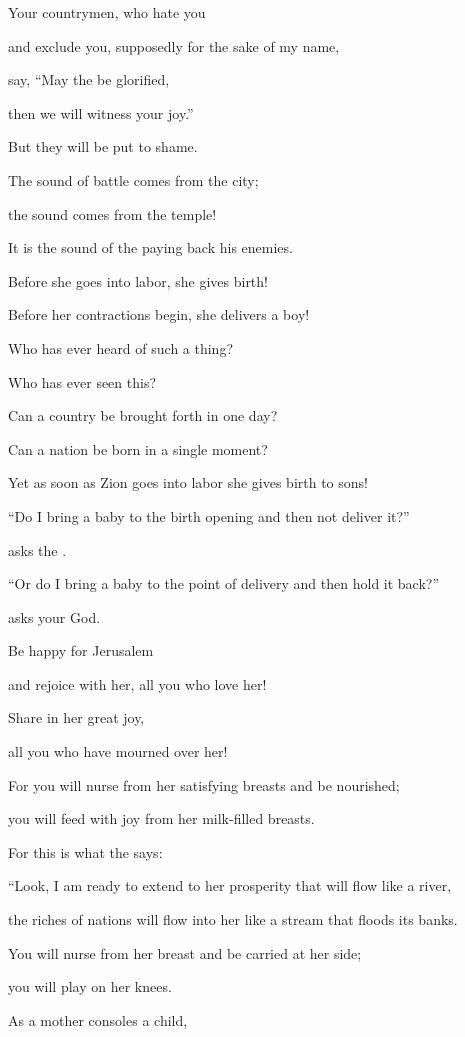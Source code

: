 {\par }{\Q Your countrymen,
who hate
you
\par }{\Q and exclude you, supposedly
for the sake
of my name,
\par }{\Q say, “May
the {}
be glorified,
\par }{\Q then
we will witness
your joy.”
\par }{\Q But they
will be put to shame.
\par }{\Q {}The sound of battle
comes from the city;
\par }{\Q the sound
comes from the temple!
\par }{\Q It is the sound
of the {}
paying
back
his enemies.
\par }{\Q {}Before
she goes into labor,
she gives birth!
\par }{\Q Before
her contractions
begin, she delivers
a boy!
\par }{\Q {}Who
has ever heard
of such a thing?
\par }{\Q Who
has ever seen
this?
\par }{\Q Can a country
be brought forth
in one
day?
\par }{\Q Can
a nation
be born
in a single
moment?
\par }{\Q Yet
as soon as Zion
goes into labor she gives birth
to sons!
\par }{\Q {}“Do I
bring a baby
to the birth
opening and then not
deliver it?”
\par }{\Q asks the
{}.
\par }{\Q “Or
do I
bring a baby
to the point of delivery
and then hold it back?”
\par }{\Q asks your God.
\par }{\Q {}Be happy
for
Jerusalem
\par }{\Q and rejoice
with
her, all
you who love
her!
\par }{\Q Share
in her great joy,
\par }{\Q all
you who have mourned
over her!
\par }{\Q {}For
you will nurse
from her satisfying
breasts
and be nourished;
\par }{\Q you will feed
with joy
from her milk-filled
breasts.
\par }{\Q {}For
this is what
the {}
says:

\par }{\Q “Look,
I am ready to extend
to her
prosperity
that will flow
like a river,
\par }{\Q the riches
of nations
will flow into her like a stream that floods its banks.
\par }{\Q You will nurse
from her breast and be carried
at her side;
\par }{\Q you will play
on
her knees.
\par }{\Q {}As
a mother
consoles
a child,

}
